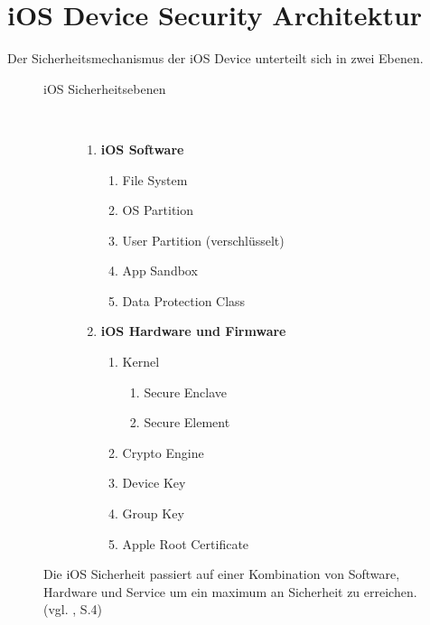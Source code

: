 \section{iOS Device Security Architektur}
\label{sec:iOSSecArchitektur}

Der Sicherheitsmechanismus der iOS Device unterteilt sich in zwei Ebenen. 
\begin{figure}[htb]
  \begin{minipage}{0.6\textwidth} 
  		\begin{description}
   			\item[ iOS Sicherheitsebenen]~\par
         		\begin{enumerate}	
				\item  \textbf{iOS Software}
					\begin{enumerate}
       						\item File System
         					\item OS Partition
						\item User Partition (verschlüsselt)
						\item App Sandbox
						\item Data Protection Class
      					\end{enumerate}
      				\item  \textbf{iOS Hardware und Firmware}~\par
					\begin{enumerate}
       						\item Kernel
						\begin{enumerate}
						\item Secure Enclave
						\item Secure Element
         					\end{enumerate}	
						\item Crypto Engine
						\item Device Key
						\item Group Key
						\item Apple Root Certificate
      					\end{enumerate}
			\end{enumerate}
   		\end{description}
Die iOS Sicherheit passiert auf einer Kombination von Software, Hardware und Service um ein maximum an Sicherheit zu erreichen. (vgl. \cite{Apple[4]}, S.4)
	\end{minipage}
	\hfil
	\begin{minipage}{0.4\textwidth}

\end{minipage}
\end{figure}
